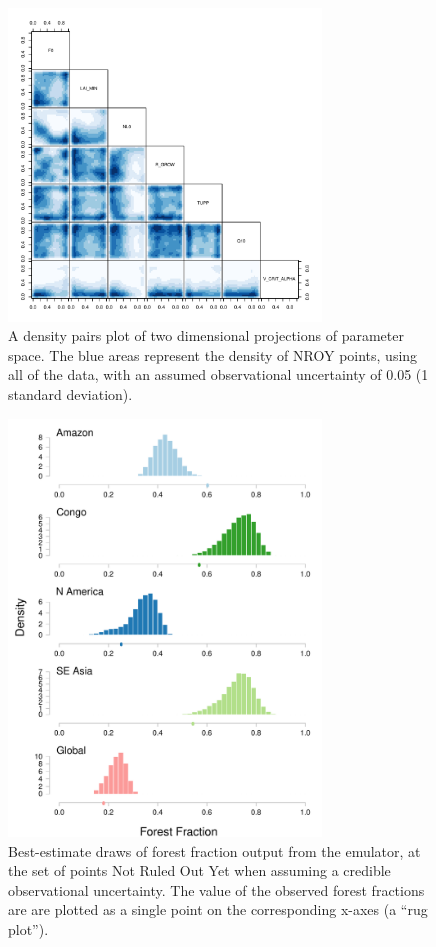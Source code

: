\documentclass[esd, article]{copernicus} %
\providecommand{\DIFaddbeginFL}{} %
\providecommand{\DIFaddendFL}{} %
\providecommand{\DIFdelbeginFL}{} %
\providecommand{\DIFdelendFL}{} %
\begin{document}
\begin{figure}[t]
\DIFdelbeginFL %
\DIFdelendFL \DIFaddbeginFL \includegraphics[width=8.3cm]{graphics/credible_NROY.pdf}
\DIFaddendFL \caption{A density pairs plot of two dimensional projections of parameter space. The blue areas represent the density of NROY points, using all of the data, with an assumed observational uncertainty of 0.05 (1 standard deviation).}
\label{fig:credible_NROY}
\end{figure}

\begin{figure}[t]
\DIFdelbeginFL %
\DIFdelendFL \DIFaddbeginFL \includegraphics[width=8.3cm]{graphics/credible_NROY_hists.pdf}
\DIFaddendFL \caption{Best-estimate draws of forest fraction output from the emulator, at the set of points Not Ruled Out Yet when assuming a credible observational uncertainty. The value of the observed forest fractions are are plotted as a single point on the corresponding x-axes (a ``rug plot'').}
\label{fig:credible_NROY_hists}
\end{figure}
\end{document}

